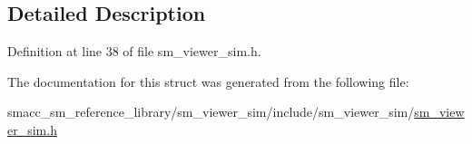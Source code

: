 \subsection{Detailed Description}


Definition at line 38 of file sm\+\_\+viewer\+\_\+sim.\+h.



The documentation for this struct was generated from the following file\+:\begin{DoxyCompactItemize}
\item 
smacc\+\_\+sm\+\_\+reference\+\_\+library/sm\+\_\+viewer\+\_\+sim/include/sm\+\_\+viewer\+\_\+sim/\hyperlink{sm__viewer__sim_8h}{sm\+\_\+viewer\+\_\+sim.\+h}\end{DoxyCompactItemize}
